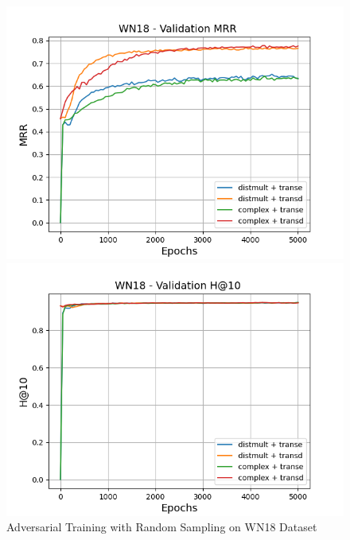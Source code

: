 \begin{figure}
\begin{minipage}{.5\textwidth}
      \includegraphics[width=0.9\linewidth]{figures/results/gan_train/pretrained/random/wn18/gan_train_random_wn18_mrrs.png}
    \end{minipage}%
    \begin{minipage}{.5\textwidth}
      \centering
      \includegraphics[width=0.9\linewidth]{figures/results/gan_train/pretrained/random/wn18/gan_train_random_wn18_hit10s.png}
    \end{minipage}%
    \caption{Adversarial Training with Random Sampling on \textsc{WN18} Dataset}
    \label{fig:test}
\end{figure}

\pagebreak